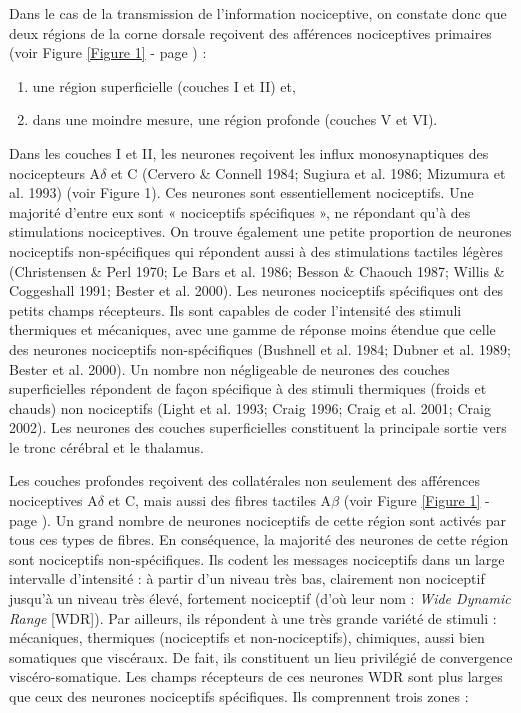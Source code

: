 \documentclass[a4paper,12pt,twoside]{report}
\begin{document}
Dans le cas de la transmission de l’information nociceptive, on constate donc que deux régions de la corne dorsale reçoivent des afférences nociceptives primaires (voir Figure \ref{Figure 1} - page \pageref{Figure 1}) :

\begin{enumerate}
\item une région superficielle (couches I et II) et, 
\item dans une moindre mesure, une région profonde (couches V et VI).
\end{enumerate}

Dans les couches I et II, les neurones reçoivent les influx monosynaptiques des nocicepteurs A$\delta$ et C (Cervero \& Connell 1984; Sugiura et al. 1986; Mizumura et al. 1993) (voir Figure 1). Ces neurones sont essentiellement nociceptifs. Une majorité d'entre eux sont « nociceptifs spécifiques », ne répondant qu’à des stimulations nociceptives. On trouve également une petite proportion de neurones nociceptifs non-spécifiques qui répondent aussi à des stimulations tactiles légères (Christensen \& Perl 1970; Le Bars et al. 1986; Besson \& Chaouch 1987; Willis \& Coggeshall 1991; Bester et al. 2000). Les neurones nociceptifs spécifiques ont des petits champs récepteurs. Ils sont capables de coder l’intensité des stimuli thermiques et mécaniques, avec une gamme de réponse moins étendue que celle des neurones nociceptifs non-spécifiques (Bushnell et al. 1984; Dubner et al. 1989; Bester et al. 2000). Un nombre non négligeable de neurones des couches superficielles répondent de façon spécifique à des stimuli thermiques (froids et chauds) non nociceptifs (Light et al. 1993; Craig 1996; Craig et al. 2001; Craig 2002). Les neurones des couches superficielles constituent la principale sortie vers le tronc cérébral et le thalamus.

Les couches profondes reçoivent des collatérales non seulement des afférences nociceptives A$\delta$ et C, mais aussi des fibres tactiles A$\beta$ (voir Figure \ref{Figure 1} - page \pageref{Figure 1}). Un grand nombre de neurones nociceptifs de cette région sont activés par tous ces types de fibres. En conséquence, la majorité des neurones de cette région sont nociceptifs non-spécifiques. Ils codent les messages nociceptifs dans un large intervalle d’intensité : à partir d'un niveau très bas, clairement non nociceptif jusqu’à un niveau très élevé, fortement nociceptif (d’où leur nom : \textit{Wide Dynamic Range} [WDR]). Par ailleurs, ils répondent à une très grande variété de stimuli : mécaniques, thermiques (nociceptifs et non-nociceptifs), chimiques, aussi bien somatiques que viscéraux. De fait, ils constituent un lieu privilégié de convergence viscéro-somatique. Les champs récepteurs de ces neurones WDR sont plus larges que ceux des neurones nociceptifs spécifiques. Ils comprennent trois zones :
 
\end{document}
